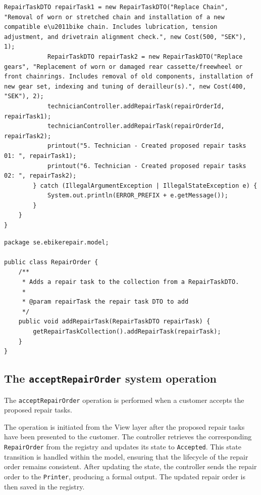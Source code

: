 \documentclass[a4paper]{scrartcl}
\begin{document}
\begin{lstlisting}[style=javastyle, caption={Main class entry point}]
            RepairTaskDTO repairTask1 = new RepairTaskDTO("Replace Chain", "Removal of worn or stretched chain and installation of a new compatible e\u2011bike chain. Includes lubrication, tension adjustment, and drivetrain alignment check.", new Cost(500, "SEK"), 1);
            RepairTaskDTO repairTask2 = new RepairTaskDTO("Replace gears", "Replacement of worn or damaged rear cassette/freewheel or front chainrings. Includes removal of old components, installation of new gear set, indexing and tuning of derailleur(s).", new Cost(400, "SEK"), 2);
            technicianController.addRepairTask(repairOrderId, repairTask1);
            technicianController.addRepairTask(repairOrderId, repairTask2);
            printout("5. Technician - Created proposed repair tasks 01: ", repairTask1);
            printout("6. Technician - Created proposed repair tasks 02: ", repairTask2);
        } catch (IllegalArgumentException | IllegalStateException e) {
            System.out.println(ERROR_PREFIX + e.getMessage());
        }
    }
}

\end{lstlisting}

\begin{lstlisting}[style=javastyle, caption={Main class entry point}]
package se.ebikerepair.model;

public class RepairOrder {
    /**
     * Adds a repair task to the collection from a RepairTaskDTO.
     *
     * @param repairTask the repair task DTO to add
     */
    public void addRepairTask(RepairTaskDTO repairTask) {
        getRepairTaskCollection().addRepairTask(repairTask);
    }
}

\end{lstlisting}

\subsection{The \texttt{acceptRepairOrder} system operation}

The \texttt{acceptRepairOrder} operation is performed when a customer accepts the proposed repair tasks.

The operation is initiated from the View layer after the proposed repair tasks have been presented to the customer. The controller retrieves the corresponding \texttt{RepairOrder} from the registry and updates its state to \texttt{Accepted}. This state transition is handled within the model, ensuring that the lifecycle of the repair order remains consistent. After updating the state, the controller sends the repair order to the \texttt{Printer}, producing a formal output. The updated repair order is then saved in the registry.
\end{document}
